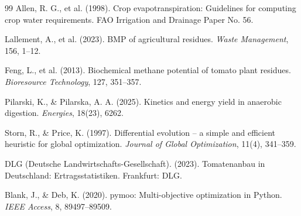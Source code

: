 \documentclass[12pt, a4paper]{article}
\begin{document}
\begin{thebibliography}{99}
 Allen, R. G., et al. (1998). Crop evapotranspiration: Guidelines for computing crop water requirements. FAO Irrigation and Drainage Paper No. 56.

 Lallement, A., et al. (2023). BMP of agricultural residues. \textit{Waste Management}, 156, 1–12.

 Feng, L., et al. (2013). Biochemical methane potential of tomato plant residues. \textit{Bioresource Technology}, 127, 351–357.

 Pilarski, K., \& Pilarska, A. A. (2025). Kinetics and energy yield in anaerobic digestion. \textit{Energies}, 18(23), 6262.

 Storn, R., \& Price, K. (1997). Differential evolution – a simple and efficient heuristic for global optimization. \textit{Journal of Global Optimization}, 11(4), 341–359.

 DLG (Deutsche Landwirtschafts-Gesellschaft). (2023). Tomatenanbau in Deutschland: Ertragsstatistiken. Frankfurt: DLG.

 Blank, J., \& Deb, K. (2020). pymoo: Multi-objective optimization in Python. \textit{IEEE Access}, 8, 89497--89509.

\end{thebibliography}
\end{document}
